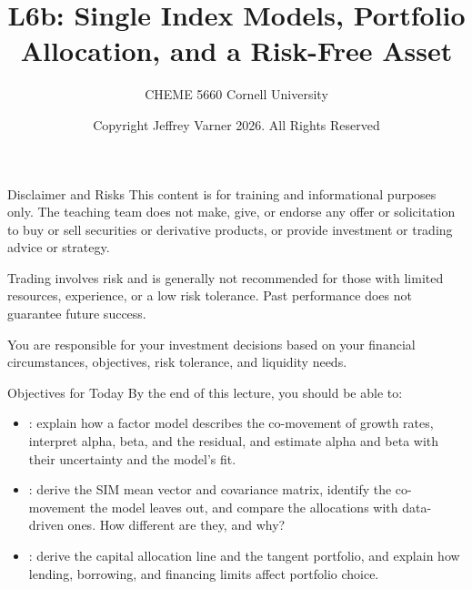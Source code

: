 \documentclass[aspectratio=169,11pt]{beamer}
\title{\texorpdfstring{{\vnheavy L6b}}{L6b}: Single Index Models, Portfolio Allocation, and a Risk-Free Asset}
\subtitle{CHEME 5660 Cornell University}
\author{Copyright Jeffrey Varner 2026. All Rights Reserved}
\begin{document}
\vntitlepage

\begin{frame}{Disclaimer and Risks}
  \vspace{0.6em}
  \textbf{} This content is for training and informational
  purposes only. The teaching team does not make, give, or endorse any offer or
  solicitation to buy or sell securities or derivative products, or provide
  investment or trading advice or strategy.

  \vspace{1.1em}
  \textbf{} Trading involves risk and is generally not recommended for
  those with limited resources, experience, or a low risk tolerance. Past
  performance does not guarantee future success.

  \vspace{1.1em}
  \textbf{} You are responsible for your investment decisions
  based on your financial circumstances, objectives, risk tolerance, and
  liquidity needs.
\end{frame}

\begin{frame}{Objectives for Today}
  By the end of this lecture, you should be able to:

  \vspace{0.4em}
  \begin{itemize}\setlength{\itemsep}{0.6em}
    \item {}: explain how
      a factor model describes the co-movement of growth rates, interpret alpha,
      beta, and the residual, and estimate alpha and beta with their uncertainty
      and the model's fit.
    \item {}: derive the
      SIM mean vector and covariance matrix, identify the co-movement the model
      leaves out, and compare the allocations with data-driven ones. How
      different are they, and why?
    \item {}: derive the capital allocation line
      and the tangent portfolio, and explain how lending, borrowing, and
      financing limits affect portfolio choice.
  \end{itemize}
\end{frame}
\end{document}
